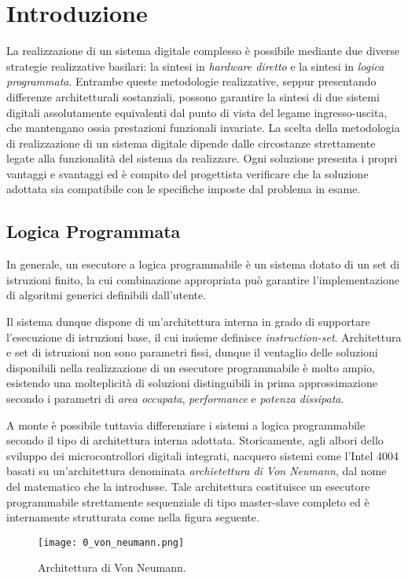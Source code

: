 \chapter{Introduzione}
La realizzazione di un sistema digitale complesso è possibile mediante due diverse strategie realizzative basilari: la sintesi in \textit{hardware diretto} e la sintesi in \textit{logica programmata}.
Entrambe queste metodologie realizzative, seppur presentando differenze architetturali sostanziali, possono garantire la sintesi di due sistemi digitali assolutamente equivalenti dal punto di vista del legame ingresso-uscita, che mantengano ossia prestazioni funzionali invariate. \newline
La scelta della metodologia di realizzazione di un sistema digitale dipende dalle circostanze strettamente legate alla funzionalità del sistema da realizzare. Ogni soluzione presenta i propri vantaggi e svantaggi ed è compito del progettista verificare che la soluzione adottata sia compatibile con le specifiche imposte dal problema in esame.  \newline

\section*{Logica Programmata}
In generale, un esecutore a logica programmabile è un sistema dotato di un set di istruzioni finito, la cui combinazione appropriata può garantire l'implementazione di algoritmi generici definibili dall'utente.\par \noindent
Il sistema dunque dispone di un'architettura interna in grado di supportare l'esecuzione di istruzioni base, il cui insieme definisce \textit{instruction-set}.
Architettura e set di istruzioni non sono parametri fissi, dunque il ventaglio delle soluzioni disponibili nella realizzazione di un esecutore programmabile è molto ampio, esistendo una molteplicità di soluzioni distinguibili in prima approssimazione secondo i parametri di \textit{area occupata}, \textit{performance} e \textit{potenza dissipata}.\par \noindent
A monte è possibile tuttavia differenziare i sistemi a logica programmabile secondo il tipo di architettura interna adottata. Storicamente, agli albori dello sviluppo dei microcontrollori digitali integrati, nacquero sistemi come l'Intel 4004 basati su un'architettura denominata \textit{archietettura di Von Neumann}, dal nome del matematico che la introdusse. Tale architettura costituisce un esecutore programmabile strettamente sequenziale di tipo master-slave completo ed è internamente strutturata come nella figura seguente.
\begin{figure}[H]
	\centering
	\texttt{[image: 0\_von\_neumann.png]}
	\caption{Architettura di Von Neumann.}
	\label{fig:von_neumann}
\end{figure}

